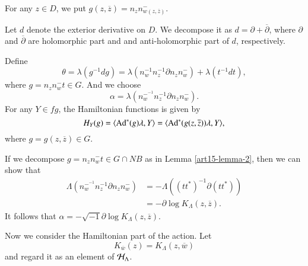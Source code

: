 For any $z \in D$, we put $g(z, \overline{z})=n_{z}n_{w(z, \overline{z})}^{-}$.

Let $d$ denote the exterior derivative on $D$. We decompose it as $d=\partial + \overline{\partial}$, where $\partial$ and $\overline{\partial}$ are holomorphic part and and anti-holomorphic part of $d$, respectively.

Define
$$
\theta= \lambda(g^{-1} dg)= \lambda(n_{w}^{-1} n_{z}^{-1}\partial n_{z}n_{w}^{-}) + \lambda(t^{-1}dt),
$$
where $g=n_{z}n_{w}^{-}t \in G$. And we choose
$$
\alpha = \lambda(n_{w}^{-^{-1}}n_{z}^{-1}\partial n_{z}n_{w}^{-}).
$$
For any $Y \in fg$, the Hamiltonian functions is given by
$$
H_{Y}(g)= \langle \operatorname{Ad}^{*}(g)\lambda, Y\rangle= \langle\operatorname{Ad}^{*}(g(z, \overline{z}))\lambda, Y\rangle,
$$
where $g=g(z, \overline{z})\in G$.

If we decompose $g = n_{z}n_{w}^{-}t \in G \cap N B$ as in Lemma \ref{art15-lemma-2}, then we can show that
\begin{align*}
\Lambda(n_{w}^{-^{-1}}n_{z}^{-1}\partial n_{z}n_{w}^{-}) &= -\Lambda((tt^{*})^{-1}\partial(tt^{*}))\\
&= -\partial \log K_{\Lambda}(z, \overline{z}).
\end{align*}
It follows that $\alpha = -\sqrt{-1}\partial \log K_{\Lambda}(z, \overline{z})$.

Now we consider the Hamiltonian part of the action. Let
$$
K_{\overline{w}}(z)=K_{\Lambda}(z, \overline{w})
$$
and regard it as an element of $\mathcal{H}_{\Lambda}$.

